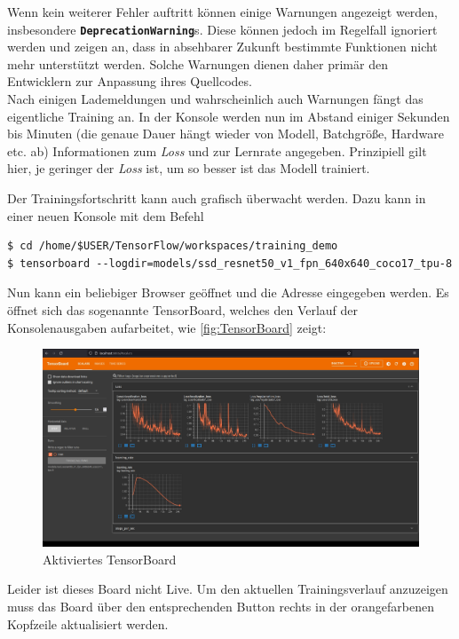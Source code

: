 \documentclass[12pt, oneside]{article}
\begin{document}
Wenn kein weiterer Fehler auftritt können einige Warnungen angezeigt werden, insbesondere \textbf{\texttt{DeprecationWarning}}s. Diese können jedoch im Regelfall ignoriert werden und zeigen an, dass in absehbarer Zukunft bestimmte Funktionen nicht mehr unterstützt werden. Solche Warnungen dienen daher primär den Entwicklern zur Anpassung ihres Quellcodes.\\

Nach einigen Lademeldungen und wahrscheinlich auch Warnungen fängt das eigentliche Training an. In der Konsole werden nun im Abstand einiger Sekunden bis Minuten (die genaue Dauer hängt wieder von Modell, Batchgröße, Hardware etc. ab) Informationen zum \textit{Loss} und zur Lernrate angegeben. Prinzipiell gilt hier, je geringer der \textit{Loss} ist, um so besser ist das Modell trainiert.

Der Trainingsfortschritt kann auch grafisch überwacht werden. Dazu kann in einer neuen Konsole mit dem Befehl

\begin{verbatim}
$ cd /home/$USER/TensorFlow/workspaces/training_demo
$ tensorboard --logdir=models/ssd_resnet50_v1_fpn_640x640_coco17_tpu-8
\end{verbatim}
Nun kann ein beliebiger Browser geöffnet und die Adresse  eingegeben werden. Es öffnet sich das sogenannte TensorBoard, welches den Verlauf der Konsolenausgaben aufarbeitet, wie \autoref{fig:TensorBoard} zeigt:

\begin{figure}[htbp]
	\centering
	\includegraphics[width=\textwidth]{Bilder/misc/TensorBoard.jpg}
	\caption{Aktiviertes TensorBoard}
	\label{fig:TensorBoard}
\end{figure}
Leider ist dieses Board nicht Live. Um den aktuellen Trainingsverlauf anzuzeigen muss das Board über den entsprechenden Button rechts in der orangefarbenen Kopfzeile aktualisiert werden.
\end{document}
